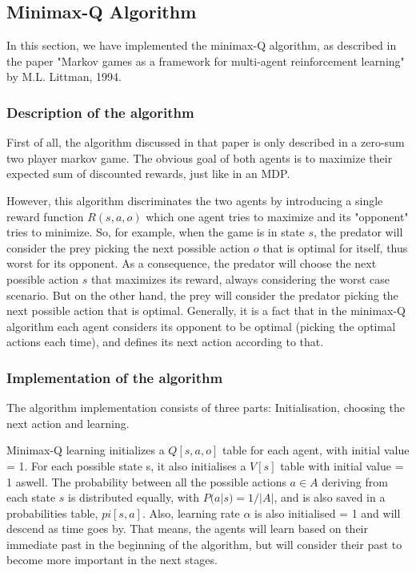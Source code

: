 \documentclass[a4paper,11pt]{article}
\begin{document}
\subsection*{Minimax-Q Algorithm}

In this section, we have implemented the minimax-Q algorithm, as described in the paper "Markov games as a framework for multi-agent reinforcement learning" by M.L. Littman, 1994.

\subsubsection*{Description of the algorithm}

First of all, the algorithm discussed in that paper is only described in a zero-sum two player markov game. The obvious goal of both agents is to maximize their expected sum of discounted rewards, just like in an MDP.

However, this algorithm discriminates the two agents by introducing a single reward function $R(s,a,o)$ which one agent tries to maximize and its "opponent" tries to minimize. So, for example, when the game is in state $s$, the predator will consider the prey picking the next possible action $o$ that is optimal for itself, thus worst for its opponent. As a consequence, the predator will choose the next possible action $s$ that maximizes its reward, always considering the worst case scenario. But on the other hand, the prey will consider the predator picking the next possible action that is optimal. Generally, it is a fact that in the minimax-Q algorithm each agent considers its opponent to be optimal (picking the optimal actions each time), and defines its next action according to that.

\subsubsection*{Implementation of the algorithm}

The algorithm implementation consists of three parts: 	Initialisation, choosing the next action and learning. 

Minimax-Q learning initializes a $Q[s,a,o]$ table for each agent, with initial value = 1. For each possible state s, it also initialises a $V[s]$ table with initial value = 1 aswell. The probability between all the possible actions $a\in A$ deriving from each state $s$ is distributed equally, with $P(a|s) = 1/|A|$, and is also saved in a probabilities table, $pi[s,a]$. Also, learning rate $\alpha$ is also initialised = 1 and will descend as time goes by. That means, the agents will learn based on their immediate past in the beginning of the algorithm, but will consider their past to become more important in the next stages.
\end{document}
